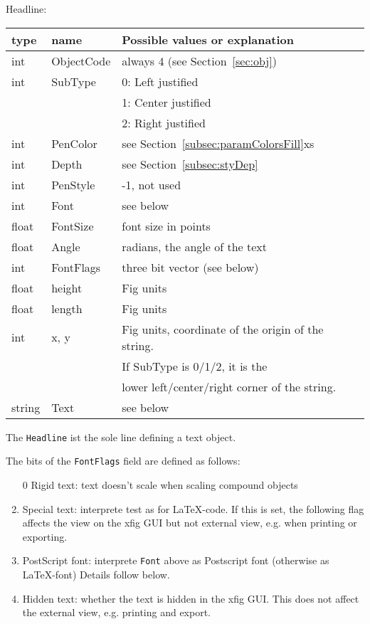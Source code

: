 \documentclass[10pt, a4paper]{article}
\begin{document}
\noindent
Headline: \\
%
\begin{tabular}{|lll|}
\hline
type   & name       & Possible values or explanation \\
\hline
\hline
int    & ObjectCode & always 4 (see Section~\ref{sec:obj}) \\
int    & SubType    & 0: Left justified \\ %
&&                    1: Center justified \\
&&                    2: Right justified \\
int    & PenColor   & see Section~\ref{subsec:paramColorsFill}xs \\
int    & Depth      & see Section~\ref{subsec:styDep} \\
int    & PenStyle   & -1, not used \\
int    & Font       & see below \\
float  & FontSize   & font size in points \\
float  & Angle      & radians, the angle of the text \\
int    & FontFlags  & three bit vector (see below) \\
float  & height     & Fig units \\
float  & length     & Fig units \\
int    & x, y       & Fig units, coordinate of the origin of the string.  \\
&&                    If SubType is 0/1/2, it is the \\
&&                    lower left/center/right corner of the string.\\
string & Text       & see below \\
\hline
\end{tabular}

The {\tt Headline} ist the sole line defining a text object. 

\noindent
The bits of the {\tt FontFlags} field are defined as follows:
%
\begin{enumerate}
\item[0]
Rigid text: text doesn't scale when scaling compound objects
\item
Special text: interprete test as for \LaTeX-code. 
If this is set, the following flag affects the view on the xfig GUI 
but not external view, e.g. when printing or exporting. 
\item
PostScript font: interprete {\tt Font} above 
as Postscript font (otherwise as \LaTeX{}-font) 
Details follow below. 
\item
Hidden text: whether the text is hidden in the xfig GUI. 
This does not affect the external view, e.g. printing and export. 
\end{enumerate}
\end{document}
